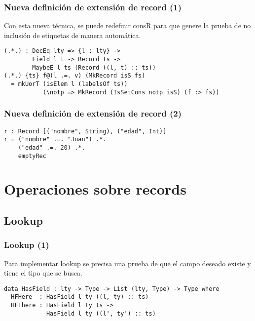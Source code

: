\documentclass{beamer}
\begin{document}
\begin{frame}[fragile]
\frametitle{Nueva definición de extensión de record (1)}

Con esta nueva técnica, se puede redefinir consR para que genere la prueba de no inclusión de etiquetas de manera automática.

\pause

\begin{definition}
\begin{verbatim}
(.*.) : DecEq lty => {l : lty} ->
        Field l t -> Record ts ->
        MaybeE l ts (Record ((l, t) :: ts))
(.*.) {ts} f@(l .=. v) (MkRecord isS fs)
  = mkUorT (isElem l (labelsOf ts))
           (\notp => MkRecord (IsSetCons notp isS) (f :> fs))
\end{verbatim}
\end{definition}

\end{frame}

\begin{frame}[fragile]
\frametitle{Nueva definición de extensión de record (2)}

\begin{example}
\begin{verbatim}
r : Record [("nombre", String), ("edad", Int)]
r = ("nombre" .=. "Juan") .*.
    ("edad" .=. 20) .*.
    emptyRec
\end{verbatim}
\end{example}

\end{frame}

\section{Operaciones sobre records}

\subsection{Lookup}

\begin{frame}[fragile]
\frametitle{Lookup (1)}

Para implementar lookup se precisa una prueba de que el campo deseado existe y tiene el tipo que se busca.

\pause

\begin{definition}
\begin{verbatim}
data HasField : lty -> Type -> List (lty, Type) -> Type where
  HFHere  : HasField l ty ((l, ty) :: ts)
  HFThere : HasField l ty ts -> 
            HasField l ty ((l', ty') :: ts)
\end{verbatim}
\end{definition}

\end{frame}
\end{document}
